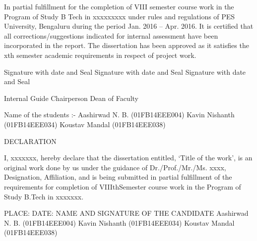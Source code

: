 \documentclass[a4paper,12pt]{article}
\begin{document}
In partial fulfillment for the completion of VIII semester course work in the Program of Study B Tech in xxxxxxxxx under rules and regulations of PES University, Bengaluru during the period Jan. 2016 – Apr.  2016. It is certified that all corrections/suggestions indicated for internal assessment have been incorporated in the report. The dissertation has been approved as it satisfies the xth semester academic requirements in respect of project work.\vspace{2mm} \newline 

\tiny
Signature with date and Seal  \hspace{1cm}    
Signature with date and Seal   \hspace{1cm}	
Signature with date and Seal

\hspace{1cm}Internal Guide \hspace{2.4cm}
 Chairperson \hspace{2.8cm}	
 \vspace{20mm}
  Dean of Faculty  
 \begin{flushleft}
 \normalsize	Name of the students :-
  \hspace{20cm}	Aashirwad N. B. (01FB14EEE004)
  \hspace{20cm}	Kavin Nishanth (01FB14EEE034)\newline
  	Koustav Mandal (01FB14EEE038)
 	
 \end{flushleft}
 		     \newpage
 		   
 		     \begin{center}
 		     \Huge	  DECLARATION
 		     \end{center}
 \Large
I, xxxxxxx, hereby declare that the dissertation entitled, ‘Title of the work’, is an original work done by us under the guidance of Dr./Prof./Mr./Ms. xxxx, Designation, Affiliation, and is being submitted in partial fulfillment of the requirements for completion of VIIIthSemester course work in the Program of Study B.Tech in xxxxxxx.   
	\vspace{3mm}
\begin{flushleft}
	\vspace{7mm}
\normalsize PLACE:\newline
\vspace{10mm}
DATE: \newline
NAME AND SIGNATURE OF THE CANDIDATE\newline
Aashirwad N. B. (01FB14EEE004) \newline
Kavin Nishanth (01FB14EEE034)\newline
Koustav Mandal (01FB14EEE038)\newline
\end{flushleft}
\newpage
\end{document}
